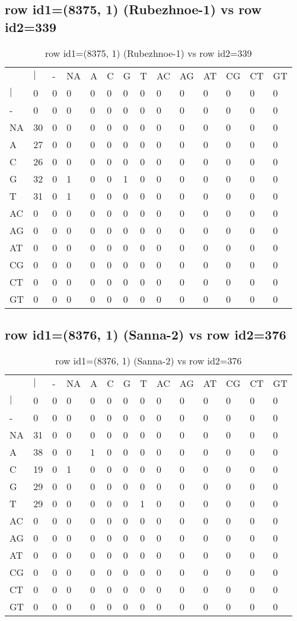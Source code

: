 \subsection{row id1=(8375, 1) (Rubezhnoe-1) vs row id2=339}
\begin{center}
\begin{longtable}{|l|l|l|l|l|l|l|l|l|l|l|l|l|l|}
\caption{row id1=(8375, 1) (Rubezhnoe-1) vs row id2=339} \label{table_dm612}\\
\hline
\\
\hline
&$|$&-&NA&A&C&G&T&AC&AG&AT&CG&CT&GT\\
$|$&0&0&0&0&0&0&0&0&0&0&0&0&0\\
-&0&0&0&0&0&0&0&0&0&0&0&0&0\\
NA&30&0&0&0&0&0&0&0&0&0&0&0&0\\
A&27&0&0&0&0&0&0&0&0&0&0&0&0\\
C&26&0&0&0&0&0&0&0&0&0&0&0&0\\
G&32&0&1&0&0&1&0&0&0&0&0&0&0\\
T&31&0&1&0&0&0&0&0&0&0&0&0&0\\
AC&0&0&0&0&0&0&0&0&0&0&0&0&0\\
AG&0&0&0&0&0&0&0&0&0&0&0&0&0\\
AT&0&0&0&0&0&0&0&0&0&0&0&0&0\\
CG&0&0&0&0&0&0&0&0&0&0&0&0&0\\
CT&0&0&0&0&0&0&0&0&0&0&0&0&0\\
GT&0&0&0&0&0&0&0&0&0&0&0&0&0\\
\hline
\end{longtable}
\end{center}

\subsection{row id1=(8376, 1) (Sanna-2) vs row id2=376}
\begin{center}
\begin{longtable}{|l|l|l|l|l|l|l|l|l|l|l|l|l|l|}
\caption{row id1=(8376, 1) (Sanna-2) vs row id2=376} \label{table_dm614}\\
\hline
\\
\hline
&$|$&-&NA&A&C&G&T&AC&AG&AT&CG&CT&GT\\
$|$&0&0&0&0&0&0&0&0&0&0&0&0&0\\
-&0&0&0&0&0&0&0&0&0&0&0&0&0\\
NA&31&0&0&0&0&0&0&0&0&0&0&0&0\\
A&38&0&0&1&0&0&0&0&0&0&0&0&0\\
C&19&0&1&0&0&0&0&0&0&0&0&0&0\\
G&29&0&0&0&0&0&0&0&0&0&0&0&0\\
T&29&0&0&0&0&0&1&0&0&0&0&0&0\\
AC&0&0&0&0&0&0&0&0&0&0&0&0&0\\
AG&0&0&0&0&0&0&0&0&0&0&0&0&0\\
AT&0&0&0&0&0&0&0&0&0&0&0&0&0\\
CG&0&0&0&0&0&0&0&0&0&0&0&0&0\\
CT&0&0&0&0&0&0&0&0&0&0&0&0&0\\
GT&0&0&0&0&0&0&0&0&0&0&0&0&0\\
\hline
\end{longtable}
\end{center}

